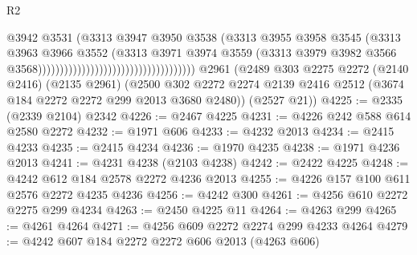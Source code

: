 \begin{lexlean}{R2}
\begin{coremodule}
                                                                  @3942
                                                                  @3531
                                                                  (@3313
                                                                    @3947
                                                                    @3950
                                                                    @3538
                                                                    (@3313
                                                                      @3955
                                                                      @3958
                                                                      @3545
                                                                      (@3313
                                                                        @3963
                                                                        @3966
                                                                        @3552
                                                                        (@3313
                                                                          @3971
                                                                          @3974
                                                                          @3559
                                                                          (@3313
                                                                            @3979
                                                                            @3982
                                                                            @3566
                                                                            @3568))))))))))))))))))))))))))))))))))))
    @2961
    (@2489
      @303
      @2275
      @2272
      (@2140 @2416)
      (@2135 @2961)
      (@2500 @302 @2272 @2274 @2139 @2416 @2512 (@3674 @184 @2272 @2272 @299 @2013 @3680 @2480))
      (@2527 @21))
@4225 := @2335 (@2339 @2104) @2342
@4226 := @2467 @4225
@4231 := @4226 @242 @588 @614 @2580 @2272
@4232 := @1971 @606
@4233 := @4232 @2013
@4234 := @2415 @4233
@4235 := @2415 @4234
@4236 := @1970 @4235
@4238 := @1971 @4236 @2013
@4241 := @4231 @4238 (@2103 @4238)
@4242 := @2422 @4225
@4248 := @4242 @612 @184 @2578 @2272 @4236 @2013
@4255 := @4226 @157 @100 @611 @2576 @2272 @4235 @4236
@4256 := @4242 @300
@4261 := @4256 @610 @2272 @2275 @299 @4234
@4263 := @2450 @4225 @11
@4264 := @4263 @299
@4265 := @4261 @4264
@4271 := @4256 @609 @2272 @2274 @299 @4233 @4264
@4279 := @4242 @607 @184 @2272 @2272 @606 @2013 (@4263 @606)

\end{coremodule}
\end{lexlean}
